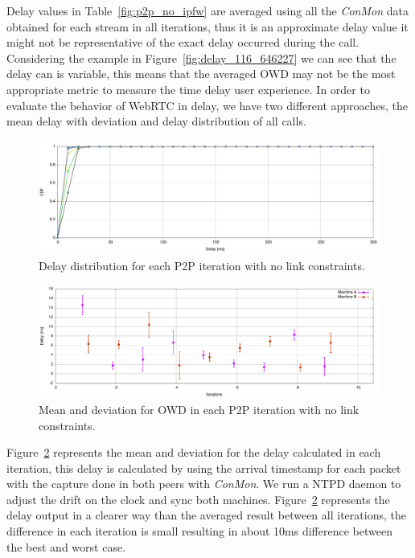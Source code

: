 Delay values in Table~\ref{fig:p2p_no_ipfw} are averaged using all the {\it ConMon} data obtained for each stream in all iterations, thus it is an approximate delay value it might not be representative of the exact delay occurred during the call. Considering the example in Figure~\ref{fig:delay_116_646227} we can see that the delay can is variable, this means that the averaged OWD may not be the most appropriate metric to measure the time delay user experience. In order to evaluate the behavior of WebRTC in delay, we have two different approaches, the mean delay with deviation and delay distribution of all calls. 

 \begin{figure}[h]
  \centering
    \includegraphics[width=1\textwidth]{./figures/total_delay_distribution_no_ipfw.pdf}
      \caption[Delay distribution for each P2P iteration with no link constraints]{Delay distribution for each P2P iteration with no link constraints.}
	\label{fig:total_delay_distribution_no_ipfw}
\end{figure}

 \begin{figure}[h]
  \centering
    \includegraphics[width=1\textwidth]{./figures/mean_deviation_delay_no_ipfw.pdf}
      \caption[Mean and deviation for OWD in each P2P iteration with no link constraints]{Mean and deviation for OWD in each P2P iteration with no link constraints.}
	\label{fig:mean_deviation_delay_no_ipfw}
\end{figure}

Figure~\ref{fig:mean_deviation_delay_no_ipfw} represents the mean and deviation for the delay calculated in each iteration, this delay is calculated by using the arrival timestamp for each packet with the capture done in both peers with {\it ConMon}. We run a NTPD daemon to adjust the drift on the clock and sync both machines. Figure~\ref{fig:mean_deviation_delay_no_ipfw} represents the delay output in a clearer way than the averaged result between all iterations, the difference in each iteration is small resulting in about 10ms difference between the best and worst case.

